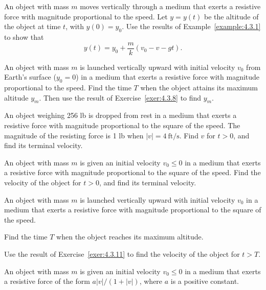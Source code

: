 \begin{exerciselist}
  \item\label{exer:4.3.8} An object with mass $m$ moves vertically through a medium that exerts a
        resistive force with magnitude proportional to the speed. Let $y=y(t)$ be the altitude of
        the object at time $t$, with $y(0)=y_{0}$. Use the results of Example~\ref{example:4.3.1} to
        show that
  \[
    y(t)=y_{0}+\frac{m}{k}(v_{0}-v-gt).
  \]

  \item\label{exer:4.3.9} An object with mass $m$ is launched vertically upward with initial
        velocity $v_{0}$ from Earth's surface ($y_{0}=0$) in a medium that exerts a resistive force
        with magnitude proportional to the speed. Find the time $T$ when the object attains its
        maximum altitude $y_{m}$. Then use the result of Exercise~\ref{exer:4.3.8} to find $y_{m}$.

  \item\label{exer:4.3.10} An object weighing 256 lb is dropped from rest in a medium that exerts a
        resistive force with magnitude proportional to the square of the speed. The magnitude of the
        resisting force is 1 lb when $|v|=4\
\mbox{ft/s}$. Find $v$ for $t>0$, and find its terminal velocity.

  \item\label{exer:4.3.11} An object with mass $m$ is given an initial velocity $v_{0}\le0$ in a
        medium that exerts a resistive force with magnitude proportional to the square of the speed.
        Find the velocity of the object for $t>0$, and find its terminal velocity.

  \item\label{exer:4.3.12} An object with mass $m$ is launched vertically upward with initial
        velocity $v_{0}$ in a medium that exerts a resistive force with magnitude proportional to
        the square of the speed.

  \begin{alist}
    \item %
    Find the time $T$ when the object reaches its maximum altitude.

    \item %
    Use the result of Exercise~\ref{exer:4.3.11} to find the velocity of the object for $t>T$.
  \end{alist}

  \item\label{exer:4.3.13} \Lex An object with mass $m$ is given an initial velocity $v_{0}\le0$ in
        a medium that exerts a resistive force of the form $a|v|/(1+|v|)$, where $a$ is a positive
        constant.


\end{exerciselist}
